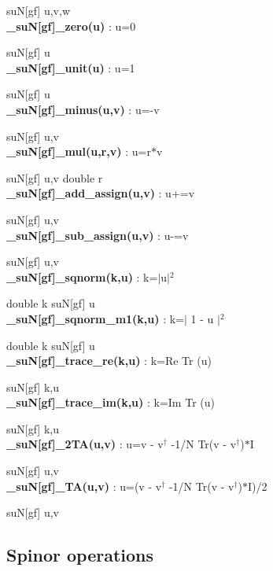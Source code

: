 \documentclass[10pt]{article}
\begin{document}
suN[gf] u,v,w\\


\noindent\textbf{\_suN[gf]\_zero(u) } : u=0

suN[gf] u\\


\noindent\textbf{\_suN[gf]\_unit(u) } : u=1

suN[gf] u\\


\noindent\textbf{\_suN[gf]\_minus(u,v) } : u=-v

suN[gf] u,v\\


\noindent\textbf{\_suN[gf]\_mul(u,r,v) } : u=r$*$v

suN[gf] u,v
double r\\


\noindent\textbf{\_suN[gf]\_add\_assign(u,v) } : u+=v

suN[gf] u,v\\


\noindent\textbf{\_suN[gf]\_sub\_assign(u,v) } : u-=v

suN[gf] u,v\\


\noindent\textbf{\_suN[gf]\_sqnorm(k,u) } : k=$|$u$|$$^2$

double  k
suN[gf] u\\


\noindent\textbf{\_suN[gf]\_sqnorm\_m1(k,u) } : k=$|$ 1 - u $|$$^2$

double  k
suN[gf] u\\


\noindent\textbf{\_suN[gf]\_trace\_re(k,u) } : k=Re Tr (u)

suN[gf] k,u\\


\noindent\textbf{\_suN[gf]\_trace\_im(k,u) } : k=Im Tr (u)

suN[gf] k,u\\


\noindent\textbf{\_suN[gf]\_2TA(u,v) } : u=v - v$^\dagger$ -1/N Tr(v - v$^\dagger$)$*$I

suN[gf] u,v\\


\noindent\textbf{\_suN[gf]\_TA(u,v) } : u=(v - v$^\dagger$ -1/N Tr(v - v$^\dagger$)$*$I)/2

suN[gf] u,v


\subsection{Spinor operations}
\end{document}
